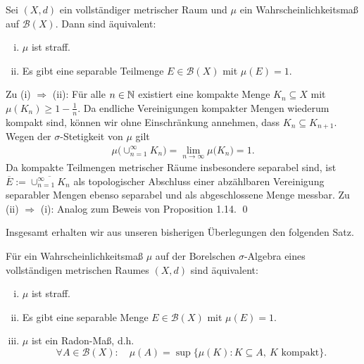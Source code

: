 \begin{proposition}
    Sei $(X,d)$ ein vollständiger metrischer Raum und $\mu$ ein Wahrscheinlichkeitsmaß auf $\mathcal{B}(X)$. Dann sind äquivalent:
    \begin{enumerate}[(i)]
        \item $\mu$ ist straff.
        \item Es gibt eine separable Teilmenge $E \in \mathcal{B}(X)$ mit $\mu(E) = 1$. 
    \end{enumerate}
\end{proposition}
\begin{proof*}
    Zu (i) $\Rightarrow$ (ii): Für alle $n \in \mathbb{N}$ existiert eine kompakte Menge $K_n \subseteq X$ mit \mbox{$\mu(K_n) \geq 1 - \frac{1}{n}$}.
    Da endliche Vereinigungen kompakter Mengen wiederum kompakt sind, können wir ohne Einschränkung annehmen, dass $K_n \subseteq K_{n+1}$. 
    Wegen der $\sigma$-Stetigkeit von $\mu$ gilt  
    \begin{align*}
        \mu\big(\cup_{n=1}^{\infty}K_n\big) = \lim_{n \to \infty}\mu\big(K_ n\big) = 1. 
    \end{align*}
    Da kompakte Teilmengen metrischer Räume insbesondere separabel sind, ist $\overline{E} := \overline{\cup_{n=1}^{\infty}K_n}$ als topologischer Abschluss einer abzählbaren Vereinigung separabler Mengen ebenso separabel und als abgeschlossene Menge messbar. 
    \newline 
    Zu (ii) $\Rightarrow$ (i): 
    Analog zum Beweis von Proposition 1.14. \qed
\end{proof*}

Insgesamt erhalten wir aus unseren bisherigen Überlegungen den folgenden Satz. 

\begin{theorem}
    Für ein Wahrscheinlichkeitsmaß $\mu$ auf der Borelschen $\sigma$-Algebra eines vollständigen metrischen Raumes $(X,d)$ sind äquivalent:
    \begin{enumerate}[(i)]
        \item $\mu$ ist straff.
        \item Es gibt eine separable Menge $E \in \mathcal{B}(X)$ mit $\mu(E) = 1$.
        \item $\mu$ ist ein Radon-Maß, d.h.
        $$
        \forall A \in \mathcal{B}(X): \quad \mu(A) = \sup\{\mu(K): K \subseteq A, \ K \text{ kompakt}\}.
        $$   
    \end{enumerate}
\end{theorem}

